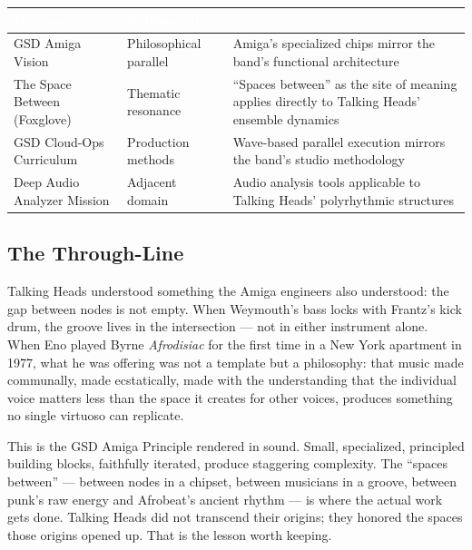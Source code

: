 \documentclass[11pt,letterpaper]{article}
\newcommand{\stageheader}[2]{%
  \noindent\colorbox{#2}{\makebox[\textwidth][l]{%
    \textcolor{white}{\bfseries\sffamily\hspace{6pt}#1\hspace{6pt}}}}%
  \vspace{0.5em}\par%
}
\newcommand{\tableheader}[1]{\textbf{\sffamily\textcolor{white}{#1}}}
\begin{document}
\begin{center}
\begin{tabularx}{\textwidth}{L{3.5cm}L{3cm}X}
\toprule
{}
\tableheader{Document} & \tableheader{Relationship} & \tableheader{Notes} \\
\midrule
GSD Amiga Vision & Philosophical parallel & Amiga's specialized chips mirror the band's functional architecture \\
The Space Between (Foxglove) & Thematic resonance & ``Spaces between'' as the site of meaning applies directly to Talking Heads' ensemble dynamics \\
GSD Cloud-Ops Curriculum & Production methods & Wave-based parallel execution mirrors the band's studio methodology \\
Deep Audio Analyzer Mission & Adjacent domain & Audio analysis tools applicable to Talking Heads' polyrhythmic structures \\
\bottomrule
\end{tabularx}
\end{center}

\subsection{The Through-Line}

Talking Heads understood something the Amiga engineers also understood: the gap between nodes is not empty. When Weymouth's bass locks with Frantz's kick drum, the groove lives in the intersection --- not in either instrument alone. When Eno played Byrne \textit{Afrodisiac} for the first time in a New York apartment in 1977, what he was offering was not a template but a philosophy: that music made communally, made ecstatically, made with the understanding that the individual voice matters less than the space it creates for other voices, produces something no single virtuoso can replicate.

This is the GSD Amiga Principle rendered in sound. Small, specialized, principled building blocks, faithfully iterated, produce staggering complexity. The ``spaces between'' --- between nodes in a chipset, between musicians in a groove, between punk's raw energy and Afrobeat's ancient rhythm --- is where the actual work gets done. Talking Heads did not transcend their origins; they honored the spaces those origins opened up. That is the lesson worth keeping.

\newpage

\stageheader{STAGE 2 --- RESEARCH REFERENCE}{secondary}
\end{document}
